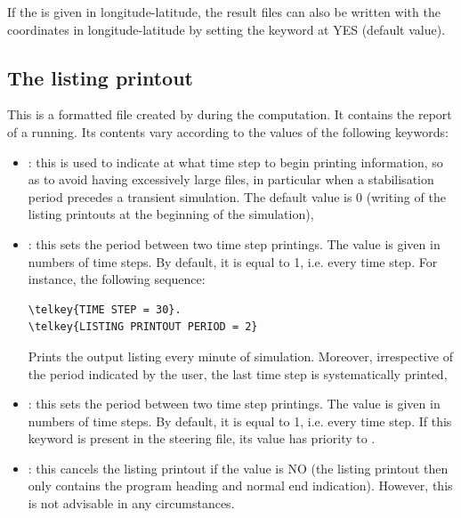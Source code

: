 If the  is given in longitude-latitude, the result files
can also be written with the coordinates in longitude-latitude
by setting the keyword 
at YES (default value).

\subsection{The listing printout}

This is a formatted file created by  during the computation.
It contains the report of a  running.
Its contents vary according to the values of the following keywords:

\begin{itemize}

\item {}:
this is used to indicate at what time step to begin printing information,
so as to avoid having excessively large files,
in particular when a stabilisation period precedes a transient simulation.
The default value is 0 (writing of the listing printouts at the
beginning of the simulation),

\item {}:
this sets the period between two time step printings.
The value is given in numbers of time steps.
By default, it is equal to 1, i.e. every time step.
For instance, the following sequence:

\begin{lstlisting}[language=TelemacCas]
\telkey{TIME STEP = 30}.
\telkey{LISTING PRINTOUT PERIOD = 2}
\end{lstlisting}

Prints the output listing every minute of simulation.
Moreover, irrespective of the period indicated by the user,
the last time step is systematically printed,

\item {}:
this sets the period between two time step printings.
The value is given in numbers of time steps.
By default, it is equal to 1, i.e. every time step.
If this keyword is present in the steering file,
its value has priority to .

\item {}:
this cancels the listing printout if the value is NO
(the listing printout then only contains the program heading and normal end
indication).
However, this is not advisable in any circumstances.


\end{itemize}
